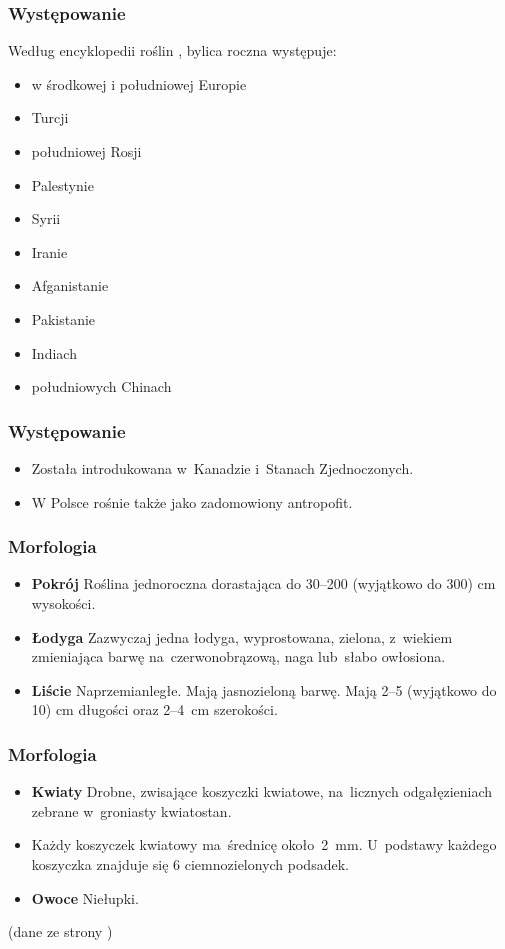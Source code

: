 \documentclass{beamer}
\begin{document}
\begin{frame}
	\frametitle{Występowanie}
	
	Według encyklopedii roślin \cite{site3}, bylica roczna występuje:
	
	\begin{itemize}
		\item w środkowej i południowej Europie
		\pause
		\item Turcji \pause
		\item południowej Rosji \pause 
		\item Palestynie \pause 
		\item Syrii \pause
		\item Iranie \pause
		\item Afganistanie \pause
		\item Pakistanie \pause
		\item Indiach \pause
		\item południowych Chinach
	\end{itemize}
\end{frame}

\begin{frame}
	\frametitle{Występowanie}
	\begin{itemize}
		\item Została introdukowana w~Kanadzie i~Stanach Zjednoczonych. \pause
		\item W Polsce rośnie także jako zadomowiony antropofit.\cite{ksiazka}
	\end{itemize}
\end{frame}

\begin{frame}
	\frametitle{Morfologia}
	\begin{itemize}
		\item
		\textbf{Pokrój}
		Roślina jednoroczna dorastająca do 30–200 (wyjątkowo do 300) cm wysokości.
		\pause
		\item
		\textbf{Łodyga}
		Zazwyczaj jedna łodyga, wyprostowana, zielona, z~wiekiem zmieniająca barwę na~czerwonobrązową, naga lub~słabo owłosiona.
		\pause
		\item
		\textbf{Liście}
		Naprzemianległe. Mają jasnozieloną barwę. Mają 2–5 (wyjątkowo do 10) cm długości oraz 2–4~cm szerokości.
		\end{itemize}
\end{frame}

\begin{frame}
	\frametitle{Morfologia}
	\begin{itemize}
		\item
		\textbf{Kwiaty}
		Drobne, zwisające koszyczki kwiatowe, na~licznych odgałęzieniach zebrane w~groniasty kwiatostan. \pause
		\item
		Każdy koszyczek kwiatowy ma~średnicę około~2~mm. U~podstawy każdego koszyczka znajduje się 6 ciemnozielonych podsadek.
		\pause
		\item
		\textbf{Owoce}
		Niełupki.
	\end{itemize}
	\centering
	(dane ze strony \cite{site3})
\end{frame}
\end{document}
